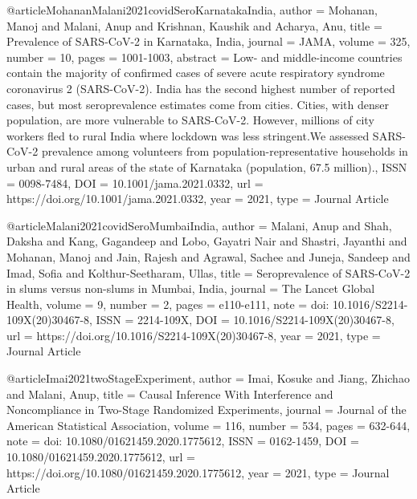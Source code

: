{{{{@article{MohananMalani2021covidSeroKarnatakaIndia,
   author = {Mohanan, Manoj and Malani, Anup and Krishnan, Kaushik and Acharya, Anu},
   title = {Prevalence of SARS-CoV-2 in Karnataka, India},
   journal = {JAMA},
   volume = {325},
   number = {10},
   pages = {1001-1003},
   abstract = {Low- and middle-income countries contain the majority of confirmed cases of severe acute respiratory syndrome coronavirus 2 (SARS-CoV-2). India has the second highest number of reported cases, but most seroprevalence estimates come from cities. Cities, with denser population, are more vulnerable to SARS-CoV-2. However, millions of city workers fled to rural India where lockdown was less stringent.We assessed SARS-CoV-2 prevalence among volunteers from population-representative households in urban and rural areas of the state of Karnataka (population, 67.5 million).},
   ISSN = {0098-7484},
   DOI = {10.1001/jama.2021.0332},
   url = {https://doi.org/10.1001/jama.2021.0332},
   year = {2021},
   type = {Journal Article}
}

@article{Malani2021covidSeroMumbaiIndia,
   author = {Malani, Anup and Shah, Daksha and Kang, Gagandeep and Lobo, Gayatri Nair and Shastri, Jayanthi and Mohanan, Manoj and Jain, Rajesh and Agrawal, Sachee and Juneja, Sandeep and Imad, Sofia and Kolthur-Seetharam, Ullas},
   title = {Seroprevalence of SARS-CoV-2 in slums versus non-slums in Mumbai, India},
   journal = {The Lancet Global Health},
   volume = {9},
   number = {2},
   pages = {e110-e111},
   note = {doi: 10.1016/S2214-109X(20)30467-8},
   ISSN = {2214-109X},
   DOI = {10.1016/S2214-109X(20)30467-8},
   url = {https://doi.org/10.1016/S2214-109X(20)30467-8},
   year = {2021},
   type = {Journal Article}
}

@article{Imai2021twoStageExperiment,
   author = {Imai, Kosuke and Jiang, Zhichao and Malani, Anup},
   title = {Causal Inference With Interference and Noncompliance in Two-Stage Randomized Experiments},
   journal = {Journal of the American Statistical Association},
   volume = {116},
   number = {534},
   pages = {632-644},
   note = {doi: 10.1080/01621459.2020.1775612},
   ISSN = {0162-1459},
   DOI = {10.1080/01621459.2020.1775612},
   url = {https://doi.org/10.1080/01621459.2020.1775612},
   year = {2021},
   type = {Journal Article}
}



}}}}
